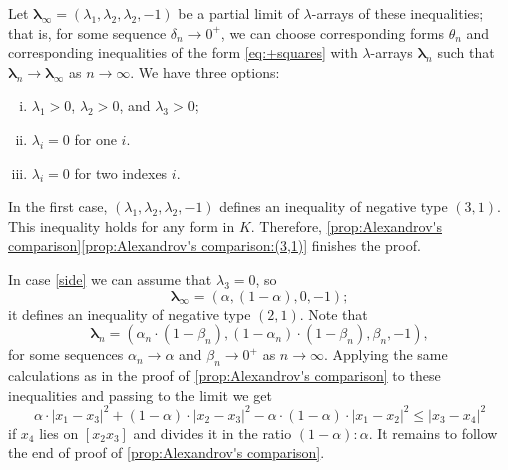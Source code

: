 \documentclass[a4paper,10pt]{article}
\begin{document}
Let $\bm{\lambda}_\infty=(\lambda_1,\lambda_2,\lambda_2,-1)$ be a partial limit of $\lambda$-arrays of these inequalities;
that is, for some sequence $\delta_n\to 0^+$, we can choose corresponding forms $\theta_n$ and corresponding inequalities of the form \ref{eq:+squares} with $\lambda$-arrays $\bm{\lambda}_n$ such that $\bm{\lambda}_n\to \bm{\lambda}_\infty$ as $n\to \infty$.
We have three options:
\begin{enumerate}[(i)]
\item\label{in} $\lambda_1>0$, $\lambda_2>0$, and $\lambda_3>0$;
\item\label{side} $\lambda_i=0$ for one $i$.
\item\label{vertex} $\lambda_i=0$ for two indexes $i$.
\end{enumerate}

In the first case,  $(\lambda_1,\lambda_2,\lambda_2,-1)$ defines an inequality of negative type $(3,1)$.
This inequality holds for any form in $K$.
Therefore, \ref{prop:Alexandrov's comparison}\ref{prop:Alexandrov's comparison:(3,1)} finishes the proof.

In case \ref{side} we can assume that $\lambda_3=0$, so
\[\bm{\lambda}_\infty=(\alpha,(1-\alpha),0,-1);\]
it defines an inequality of negative type $(2,1)$.
Note that
\[\bm{\lambda}_n=(\alpha_n\cdot(1-\beta_n),(1-\alpha_n)\cdot(1-\beta_n),\beta_n,-1),\]
for some sequences $\alpha_n\to\alpha$ and $\beta_n\to 0^+$ as $n\to\infty$.
Applying the same calculations as in the proof of \ref{prop:Alexandrov's comparison} to these inequalities and passing to the limit we get
\[
\alpha\cdot|x_1-x_3|^2+(1-\alpha)\cdot|x_2-x_3|^2-\alpha\cdot (1-\alpha)\cdot|x_1-x_2|^2
\le
|x_3-x_4|^2
\]
if $x_4$ lies on $[x_2x_3]$ and divides it in the ratio $(1-\alpha):\alpha$.
It remains to follow the end of proof of \ref{prop:Alexandrov's comparison}.
\end{document}
